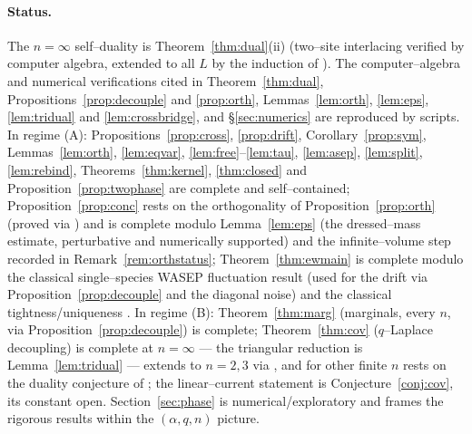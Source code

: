 \documentclass[11pt]{article}
\theoremstyle{plain}
\theoremstyle{definition}
\theoremstyle{remark}
\begin{document}
\paragraph{Status.} The $n=\infty$ self--duality is Theorem~\ref{thm:dual}(ii)
(two--site interlacing verified by computer algebra, extended to all $L$ by the
induction of \cite{REU}). The computer--algebra and numerical verifications cited in
Theorem~\ref{thm:dual}, Propositions~\ref{prop:decouple} and \ref{prop:orth},
Lemmas~\ref{lem:orth}, \ref{lem:eps}, \ref{lem:tridual} and \ref{lem:crossbridge}, and
\S\ref{sec:numerics} are reproduced by scripts. In regime (A): Propositions~\ref{prop:cross},
\ref{prop:drift}, Corollary~\ref{prop:sym}, Lemmas~\ref{lem:orth}, \ref{lem:eqvar},
\ref{lem:free}--\ref{lem:tau}, \ref{lem:asep}, \ref{lem:split}, \ref{lem:rebind},
Theorems~\ref{thm:kernel}, \ref{thm:closed} and Proposition~\ref{prop:twophase} are
complete and self--contained; Proposition~\ref{prop:conc} rests on the orthogonality
of Proposition~\ref{prop:orth} (proved via \cite{CFG20}) and is complete modulo
Lemma~\ref{lem:eps} (the dressed--mass estimate, perturbative and numerically
supported) and the infinite--volume step recorded in Remark~\ref{rem:orthstatus}; Theorem~\ref{thm:ewmain} is complete modulo the classical
single--species WASEP fluctuation result (used for the drift via
Proposition~\ref{prop:decouple} and the diagonal noise) and the classical
tightness/uniqueness \cite{KL}. In regime
(B): Theorem~\ref{thm:marg} (marginals, every $n$, via
Proposition~\ref{prop:decouple}) is complete; Theorem~\ref{thm:cov} ($q$--Laplace
decoupling) is complete at $n=\infty$ --- the triangular reduction is
Lemma~\ref{lem:tridual} --- extends to $n=2,3$ via \cite{REU}, and for other finite
$n$ rests on the duality conjecture of \cite[Rmk.~4]{REU}; the linear--current
statement is Conjecture~\ref{conj:cov}, its constant open. Section~\ref{sec:phase} is numerical/exploratory and frames the rigorous
results within the $(\alpha,q,n)$ picture.
\end{document}
